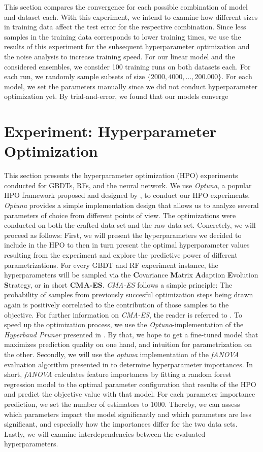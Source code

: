 This section compares the convergence for each possible combination of model and dataset each. With this experiment, we intend to examine how different sizes in training data affect the test error for the respective combination. Since less samples in the training data corresponds to lower training times, we use the results of this experiment for the subsequent hyperparameter optimization and the noise analysis to increase training speed. For our linear model and the considered ensembles, we consider 100 training runs on both datasets each. For each run, we randomly sample subsets of size $ \{2000, 4000, \dots, 200.000\} $. For each model, we set the parameters manually since we did not conduct hyperparameter optimization yet. By trial-and-error, we found that our models converge 

\section{Experiment: Hyperparameter Optimization}\label{sec:hpo}
This section presents the hyperparameter optimization (HPO) experiments conducted for GBDTs, RFs, and the neural network. 
We use \textit{Optuna}, a popular HPO framework proposed and designed by \cite{akiba2019optuna}, to conduct our HPO experiments. 
\textit{Optuna} provides a simple implementation design that allows us to analyze several parameters of choice from different points of view. 
The optimizations were conducted on both the crafted data set and the raw data set. 
Concretely, we will proceed as follows: First, we will present the hyperparameters we decided to include in the HPO to then in turn present the optimal hyperparameter values resulting from the experiment and explore the predictive power of different parametrizations. 
For every GBDT and RF experiment instance, the hyperparameters will be sampled via the \textbf{C}ovariance \textbf{M}atrix \textbf{A}daption \textbf{E}volution \textbf{S}trategy, or in short \textbf{CMA-ES}. 
\textit{CMA-ES} follows a simple principle: The probability of samples from previously succesful optimization steps being drawn again is positively correlated to the contribution of those samples to the objective. For further information on \textit{CMA-ES}, the reader is referred to \cite{hansen2016cma}. 
To speed up the optimization process, we use the \textit{Optuna}-implementation of the \textit{Hyperband Pruner} presented in \cite{li2018hyperband}. 
By that, we hope to get a fine-tuned model that maximizes prediction quality on one hand, and intuition for parametrization on the other.
Secondly, we will use the \textit{optuna} implementation of the \textit{fANOVA} evaluation algorithm presented in \cite{fANOVA} to determine hyperparameter importances. 
In short, \textit{fANOVA} calculates feature importances by fitting a random forest regression model to the optimal parameter configuration that results of the HPO and predict the objective value with that model. For each parameter importance prediction, we set the number of estimators to 1000.
Thereby, we can assess which parameters impact the model significantly and which parameters are less significant, and especially how the importances differ for the two data sets. 
Lastly, we will examine interdependencies between the evaluated hyperparameters. 
 
